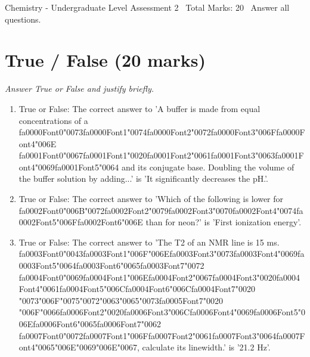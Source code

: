 \documentclass[12pt]{article}
\begin{document}
\begin{center}
Chemistry - Undergraduate Level Assessment 2 \
Total Marks: 20 \
Answer all questions.
\end{center}

\section*{True / False (20 marks)}
\textit{Answer True or False and justify briefly.}
\begin{enumerate}[label=\arabic*.]
\item True or False: The correct answer to 'A buffer is made from equal concentrations of a {\csname fa0000Font0\endcsname\char"0073}{\csname fa0000Font1\endcsname\char"0074}{\csname fa0000Font2\endcsname\char"0072}{\csname fa0000Font3\endcsname\char"006F}{\csname fa0000Font4\endcsname\char"006E} {\csname fa0001Font0\endcsname\char"0067}{\csname fa0001Font1\endcsname\char"0020}{\csname fa0001Font2\endcsname\char"0061}{\csname fa0001Font3\endcsname\char"0063}{\csname fa0001Font4\endcsname\char"0069}{\csname fa0001Font5\endcsname\char"0064} and its conjugate base. Doubling the volume of the buffer solution by adding...' is 'It significantly decreases the pH.'.
\item True or False: The correct answer to 'Which of the following is lower for {\csname fa0002Font0\endcsname\char"006B}{\char"0072}{\csname fa0002Font2\endcsname\char"0079}{\csname fa0002Font3\endcsname\char"0070}{\csname fa0002Font4\endcsname\char"0074}{\csname fa0002Font5\endcsname\char"006F}{\csname fa0002Font6\endcsname\char"006E} than for neon?' is 'First ionization energy'.
\item True or False: The correct answer to 'The T2 of an NMR line is 15 ms. {\csname fa0003Font0\endcsname\char"0043}{\csname fa0003Font1\endcsname\char"006F}{\char"006E}{\csname fa0003Font3\endcsname\char"0073}{\csname fa0003Font4\endcsname\char"0069}{\csname fa0003Font5\endcsname\char"0064}{\csname fa0003Font6\endcsname\char"0065}{\csname fa0003Font7\endcsname\char"0072} {\csname fa0004Font0\endcsname\char"0069}{\csname fa0004Font1\endcsname\char"006E}{\csname fa0004Font2\endcsname\char"0067}{\csname fa0004Font3\endcsname\char"0020}{\csname fa0004Font4\endcsname\char"0061}{\csname fa0004Font5\endcsname\char"006C}{\csname fa0004Font6\endcsname\char"006C}{\csname fa0004Font7\endcsname\char"0020} {\char"0073}{\char"006F}{\char"0075}{\char"0072}{\char"0063}{\char"0065}{\char"0073}{\csname fa0005Font7\endcsname\char"0020} {\char"006F}{\char"0066}{\csname fa0006Font2\endcsname\char"0020}{\csname fa0006Font3\endcsname\char"006C}{\csname fa0006Font4\endcsname\char"0069}{\csname fa0006Font5\endcsname\char"006E}{\csname fa0006Font6\endcsname\char"0065}{\csname fa0006Font7\endcsname\char"0062} {\csname fa0007Font0\endcsname\char"0072}{\csname fa0007Font1\endcsname\char"006F}{\csname fa0007Font2\endcsname\char"0061}{\csname fa0007Font3\endcsname\char"0064}{\csname fa0007Font4\endcsname\char"0065}{\char"006E}{\char"0069}{\char"006E}{\char"0067}, calculate its linewidth.' is '21.2 Hz'.

\end{enumerate}
\end{document}
